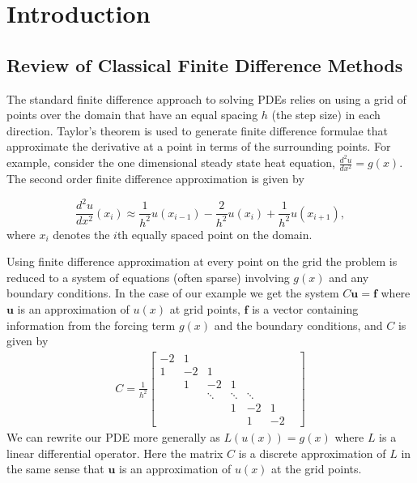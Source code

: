 \documentclass[12pt]{article}
\let\vec\mathbf
\begin{document}
\tableofcontents

\section{Introduction}

\subsection{Review of Classical Finite Difference Methods} 
The standard finite difference approach to solving PDEs relies on using a grid of points over the domain that have an equal spacing $h$ (the step size) in each direction. Taylor's theorem is used to generate finite difference formulae that approximate the derivative at a point in terms of the surrounding points. For example, consider the one dimensional steady state heat equation, $\frac{d^2u}{dx^2} = g(x)$. The second order finite difference approximation is given by

$$
\frac{d^2u}{dx^2}(x_i) \approx \frac{1}{h^2}u(x_{i-1}) - \frac{2}{h^2} u(x_i) + \frac{1}{h^2} u(x_{i+1}),
$$
where $x_i$ denotes the $i$th equally spaced point on the domain.

Using finite difference approximation at every point on the grid the problem is reduced to a system of equations (often sparse) involving $g(x)$ and any boundary conditions. In the case of our example we get the system $C\vec{u} = \vec{f}$ where $\vec{u}$ is an approximation of $u(x)$ at grid points, $\vec{f}$ is a vector containing information from the forcing term $g(x)$ and the boundary conditions, and $C$ is given by
\begin{align*}
C = 
\frac{1}{h^2}\begin{bmatrix}
-2 & 1  &     &   &  &  &\\
1 & -2 &  1  &   &  &  &\\
& 1  &  -2 & 1 &  &  &\\
&    & \ddots & \ddots & \ddots&\\
&    &     & 1 & -2 & 1  \\
&    &     &   &  1 & -2
\end{bmatrix}
\end{align*}
We can rewrite our PDE more generally as $L(u(x))=g(x)$ where $L$ is a linear differential operator. Here the matrix $C$ is a discrete approximation of $L$ in the same sense that $\vec{u}$ is an approximation of $u(x)$ at the grid points.
\end{document}
